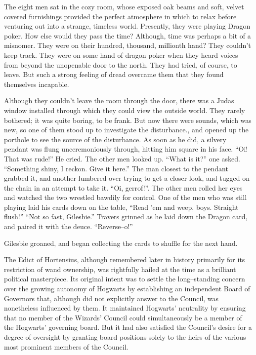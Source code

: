 \begin{flushright}
The eight men sat in the cozy room, whose exposed oak beams and soft, velvet covered furnishings provided the perfect atmosphere in which to relax before venturing out into a strange, timeless world. Presently, they were playing Dragon poker. How else would they pass the time? Although, time was perhaps a bit of a misnomer. They were on their hundred, thousand, millionth hand? They couldn’t keep track. They were on some hand of dragon poker when they heard voices from beyond the unopenable door to the north. They had tried, of course, to leave. But such a strong feeling of dread overcame them that they found themselves incapable.

Although they couldn’t leave the room through the door, there was a Judas window installed through which they could view the outside world. They rarely bothered; it was quite boring, to be frank. But now there were sounds, which was new, so one of them stood up to investigate the disturbance., and opened up the porthole to see the source of the disturbance. As soon as he did, a silvery pendant was flung unceremoniously through, hitting him square in his face.
\SmallVSpace
“Oi! That was rude!” He cried.
\SmallVSpace
The other men looked up. “What is it?” one asked.
\SmallVSpace
“Something shiny, I reckon. Give it here.” The man closest to the pendant grabbed it, and another lumbered over trying to get a closer look, and tugged on the chain in an attempt to take it. “Oi, gerrof!”.
\SmallVSpace
The other men rolled her eyes and watched the two wrestled bawdily for control. One of the men who was still playing laid his cards down on the table, “Read ’em and weep, boys. Straight flush!”
\SmallVSpace
“Not so fast, Gilesbie.” Travers grinned as he laid down the Dragon card, and paired it with the deuce. “Reverse\mbox{--}o!”

Gilesbie groaned, and began collecting the cards to shuffle for the next hand.
\end{flushright}
\simpleline
\pagebreak
The Edict of Hortensius, although remembered later in history primarily for its restriction of wand ownership, was rightfully hailed at the time as a brilliant political masterpiece. Its original intent was to settle the long\mbox{--}standing concern over the growing autonomy of Hogwarts by establishing an independent Board of Governors that, although did not explicitly answer to the Council, was nonetheless influenced by them.
\SmallVSpace
It maintained Hogwarts’ neutrality by ensuring that no member of the Wizards’ Council could simultaneously be a member of the Hogwarts’ governing board. But it had also satisfied the Council’s desire for a degree of oversight by granting board positions solely to the heirs of the various most prominent members of the Council.
